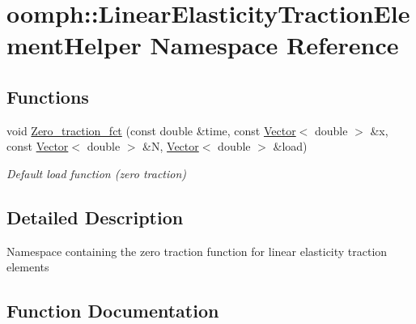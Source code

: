 \hypertarget{namespaceoomph_1_1LinearElasticityTractionElementHelper}{}\section{oomph\+:\+:Linear\+Elasticity\+Traction\+Element\+Helper Namespace Reference}
\label{namespaceoomph_1_1LinearElasticityTractionElementHelper}
\subsection*{Functions}
\begin{DoxyCompactItemize}
\item 
void \hyperlink{namespaceoomph_1_1LinearElasticityTractionElementHelper_a74b833c7c02c1633b6bf0e49c6e4c38e}{Zero\+\_\+traction\+\_\+fct} (const double \&time, const \hyperlink{classoomph_1_1Vector}{Vector}$<$ double $>$ \&x, const \hyperlink{classoomph_1_1Vector}{Vector}$<$ double $>$ \&N, \hyperlink{classoomph_1_1Vector}{Vector}$<$ double $>$ \&load)
\begin{DoxyCompactList}\small\item\em Default load function (zero traction) \end{DoxyCompactList}\end{DoxyCompactItemize}


\subsection{Detailed Description}
Namespace containing the zero traction function for linear elasticity traction elements 

\subsection{Function Documentation}
\mbox{\label{namespaceoomph_1_1LinearElasticityTractionElementHelper_a74b833c7c02c1633b6bf0e49c6e4c38e}} 
